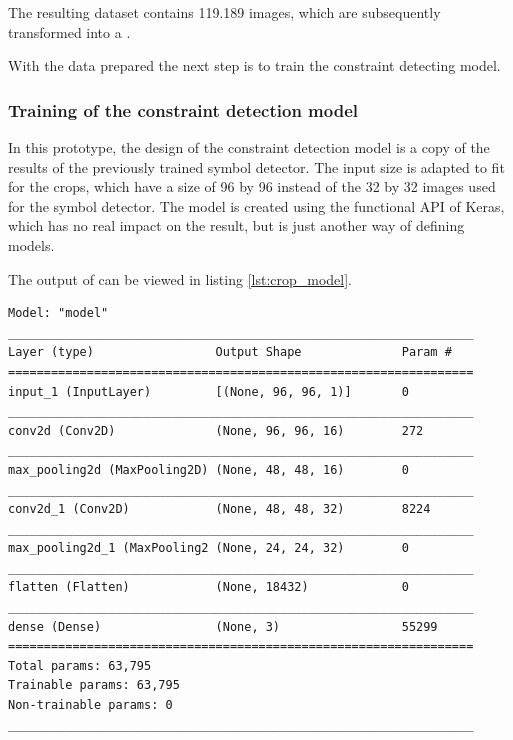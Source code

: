 The resulting dataset contains 119.189 images, which are subsequently transformed into a .


With the data prepared the next step is to train the constraint detecting model.

\subsubsection{Training of the constraint detection model}

In this prototype, the design of the constraint detection model is a copy of the results of the previously trained symbol detector.
The input size is adapted to fit for the crops, which have a size of 96 by 96 instead of the 32 by 32 images used for the symbol detector.
The model is created using the functional API of Keras, which has no real impact on the result, but is just another way of defining models.

The output of  can be viewed in listing \ref{lst:crop_model}.
\begin{lstlisting}[label={lst:crop_model}, caption={Summary of Constraint Detector.}]
Model: "model"
_________________________________________________________________
Layer (type)                 Output Shape              Param #   
=================================================================
input_1 (InputLayer)         [(None, 96, 96, 1)]       0         
_________________________________________________________________
conv2d (Conv2D)              (None, 96, 96, 16)        272       
_________________________________________________________________
max_pooling2d (MaxPooling2D) (None, 48, 48, 16)        0         
_________________________________________________________________
conv2d_1 (Conv2D)            (None, 48, 48, 32)        8224      
_________________________________________________________________
max_pooling2d_1 (MaxPooling2 (None, 24, 24, 32)        0         
_________________________________________________________________
flatten (Flatten)            (None, 18432)             0         
_________________________________________________________________
dense (Dense)                (None, 3)                 55299     
=================================================================
Total params: 63,795
Trainable params: 63,795
Non-trainable params: 0
_________________________________________________________________    
\end{lstlisting}


